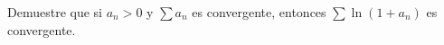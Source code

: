 \item Demuestre que si $a_n > 0$ y $\sum a_n$ es convergente, entonces $\sum \ln(1 + a_n)$ es convergente.
